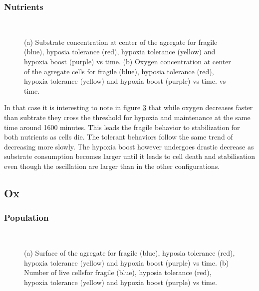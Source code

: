 \documentclass[11pt,a4paper]{article}
\begin{document}
\subsubsection{Nutrients}
\begin{figure}[h]
\begin{subfigure}{0.5\textwidth}
	\centering
	
	\caption{ \label{Su_OS_S_ctr}}
\end{subfigure}
~~
\begin{subfigure}{0.5\textwidth}
	\centering
	
	\caption{\label{Su_OS_O_ctr}}
\end{subfigure}
\caption{(a) Substrate concentration at center of the agregate for fragile (blue), hyposia tolerance (red), hypoxia tolerance (yellow) and hypoxia boost (purple) vs time. (b) Oxygen concentration at center of the agregate cells for fragile (blue), hyposia tolerance (red), hypoxia tolerance (yellow) and hypoxia boost (purple) vs time. vs time. \label{Su_OS_SO_ctr}}
\end{figure}

In that case it is interesting to note in figure \ref{Su_OS_SO_ctr} that while oxygen decreases faster than subtrate they cross the threshold for hypoxia and maintenance at the same time around 1600 minutes. This leads the fragile behavior to stabilization for both nutrients as cells die. The tolerant behaviors follow the same trend of decreasing more slowly. The hypoxia boost however undergoes drastic decrease as substrate consumption becomes larger until it leads to cell death and stabilisation even though the oscillation are larger than in the other configurations.\\

\newpage
\subsection{Ox}
\subsubsection{Population}
\begin{figure}[h]
\begin{subfigure}{0.5\textwidth}
	\centering
	
	\caption{ \label{Ox_OS_area}}
\end{subfigure}
~~
\begin{subfigure}{0.5\textwidth}
	\centering
	
	\caption{\label{Ox_OS_live}}
\end{subfigure}
\caption{(a) Surface of the agregate for fragile (blue), hyposia tolerance (red), hypoxia tolerance (yellow) and hypoxia boost (purple) vs time. (b) Number of live cellsfor fragile (blue), hyposia tolerance (red), hypoxia tolerance (yellow) and hypoxia boost (purple) vs time. \label{Ox_OS_area_live}}
\end{figure}
\end{document}
